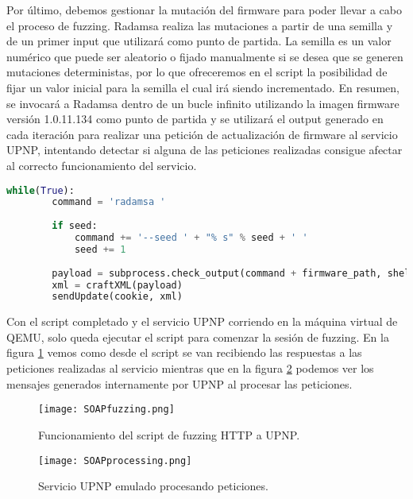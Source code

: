 Por último, debemos gestionar la mutación del firmware para poder llevar a cabo el proceso de fuzzing. Radamsa realiza las 
mutaciones a partir de una semilla y de un primer input que utilizará como punto de partida. La semilla es un valor numérico 
que puede ser aleatorio o fijado manualmente si se desea que se generen mutaciones deterministas, por lo que ofreceremos en 
el script la posibilidad de fijar un valor inicial para la semilla el cual irá siendo incrementado. En resumen, se invocará
a Radamsa dentro de un bucle infinito utilizando la imagen firmware versión 1.0.11.134 como punto de partida y se utilizará 
el output generado en cada iteración para realizar una petición de actualización de firmware al servicio UPNP, intentando 
detectar si alguna de las peticiones realizadas consigue afectar al correcto funcionamiento del servicio.

\begin{lstlisting}[language=python, caption=Integración con Radamsa para mutación de inputs., captionpos=b,
    frame=single, breaklines, showstringspaces=false]
    while(True):
        command = 'radamsa '
        
        if seed:
            command += '--seed ' + "% s" % seed + ' '
            seed += 1
        
        payload = subprocess.check_output(command + firmware_path, shell=True)
        xml = craftXML(payload)
        sendUpdate(cookie, xml)
\end{lstlisting}

Con el script completado y el servicio UPNP corriendo en la máquina virtual de QEMU, solo queda ejecutar el script para 
comenzar la sesión de fuzzing. En la figura \ref{fig:SOAPfuzzing} vemos como desde el script se van recibiendo las respuestas a las peticiones 
realizadas al servicio mientras que en la figura \ref{fig:SOAPprocessing} podemos ver los mensajes generados internamente por
UPNP al procesar las peticiones.

\begin{figure}[H]
    \centering
    \texttt{[image: SOAPfuzzing.png]}
    \caption{Funcionamiento del script de fuzzing HTTP a UPNP.}
    \label{fig:SOAPfuzzing}
\end{figure}

\begin{figure}[H]
    \centering
    \texttt{[image: SOAPprocessing.png]}
    \caption{Servicio UPNP emulado procesando peticiones.}
    \label{fig:SOAPprocessing}
\end{figure}

